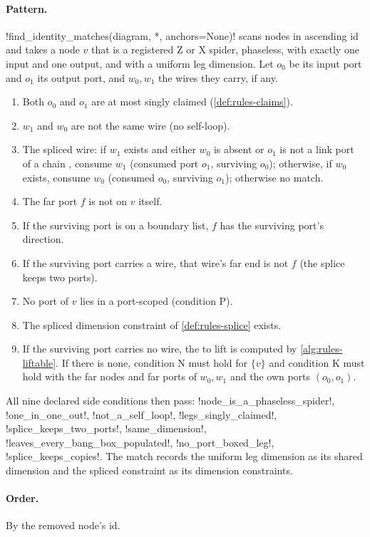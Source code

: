\paragraph{Pattern.} \py!find_identity_matches(diagram, *, anchors=None)! scans nodes in ascending id and takes a node $v$ that is a registered Z or X spider, phaseless, with exactly one input and one output, and with a uniform leg dimension. Let $o_0$ be its input port and $o_1$ its output port, and $w_0,w_1$ the wires they carry, if any.
\begin{enumerate}
\item Both $o_0$ and $o_1$ are at most singly claimed (\cref{def:rules-claims}).
\item $w_1$ and $w_0$ are not the same wire (no self-loop).
\item The spliced wire: if $w_1$ exists and either $w_0$ is absent or $o_1$ is not a link port of a chain \bbox{}, consume $w_1$ (consumed port $o_1$, surviving $o_0$); otherwise, if $w_0$ exists, consume $w_0$ (consumed $o_0$, surviving $o_1$); otherwise no match.
\item The far port $f$ is not on $v$ itself.
\item If the surviving port is on a boundary list, $f$ has the surviving port's direction.
\item If the surviving port carries a wire, that wire's far end is not $f$ (the splice keeps two ports).
\item No port of $v$ lies in a port-scoped \bbox{} (condition P).
\item The spliced dimension constraint of \cref{def:rules-splice} exists.
\item If the surviving port carries no wire, the \bbox{} to lift is computed by \cref{alg:rules-liftable}. If there is none, condition N must hold for $\{v\}$ and condition K must hold with the far nodes and far ports of $w_0,w_1$ and the own ports $(o_0,o_1)$.
\end{enumerate}
All nine declared side conditions then pass: \code!node_is_a_phaseless_spider!, \code!one_in_one_out!, \code!not_a_self_loop!, \code!legs_singly_claimed!, \code!splice_keeps_two_ports!, \code!same_dimension!, \code!leaves_every_bang_box_populated!, \code!no_port_boxed_leg!, \code!splice_keeps_copies!. The match records the uniform leg dimension as its shared dimension and the spliced constraint as its dimension constraints.

\paragraph{Order.} By the removed node's id.

